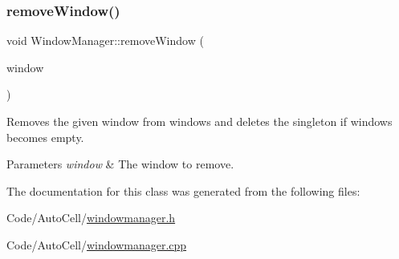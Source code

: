 \subsubsection{\texorpdfstring{remove\+Window()}{removeWindow()}}
{\footnotesize\ttfamily void Window\+Manager\+::remove\+Window (\begin{DoxyParamCaption}\item[{Q\+Widget $\ast$}]{window }\end{DoxyParamCaption})}

Removes the given window from windows and deletes the singleton if windows becomes empty.


\begin{DoxyParams}{Parameters}
{\em window} & The window to remove. \\
\hline
\end{DoxyParams}


The documentation for this class was generated from the following files\+:\begin{DoxyCompactItemize}
\item 
Code/\+Auto\+Cell/\mbox{\hyperlink{windowmanager_8h}{windowmanager.\+h}}\item 
Code/\+Auto\+Cell/\mbox{\hyperlink{windowmanager_8cpp}{windowmanager.\+cpp}}\end{DoxyCompactItemize}
